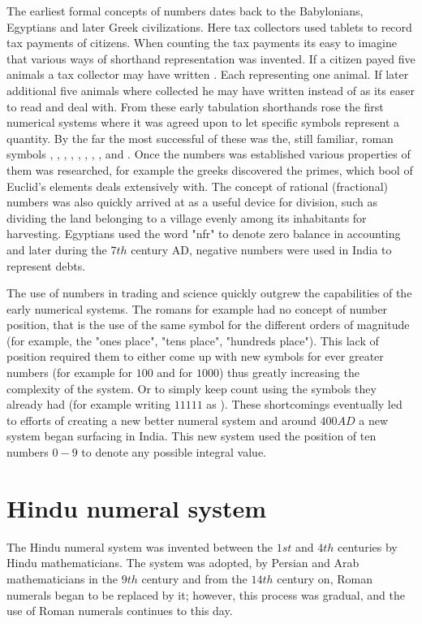 \myindent The earliest formal concepts of numbers dates back to the Babylonians, Egyptians and later Greek civilizations. Here tax collectors used tablets to record tax payments of citizens. When counting the tax payments its easy to imagine that various ways of shorthand representation was invented. If a citizen payed five animals a tax collector may have written . Each  representing one animal. If later additional five animals where collected he may have written  instead of  as its easer to read and deal with. From these early tabulation shorthands rose the first numerical systems where it was agreed upon to let specific symbols represent a quantity. By the far the most successful of these was the, still familiar, roman symbols , , , , , , , ,  and . Once the numbers was established various properties of them was researched, for example the greeks discovered the primes, which bool  of Euclid's elements deals extensively with. The concept of rational (fractional) numbers was also quickly arrived at as a useful device for division, such as dividing the land belonging to a village evenly among its inhabitants for harvesting. Egyptians used the word "nfr" to denote zero balance in accounting and later during the $7th$ century AD, negative numbers were used in India to represent debts.

\myindent The use of numbers in trading and science quickly outgrew the capabilities of the early numerical systems. The romans for example had no concept of number position, that is the use of the same symbol for the different orders of magnitude (for example, the "ones place", "tens place", "hundreds place"). This lack of position required them to either come up with new symbols for ever greater numbers (for example  for $100$ and  for $1000$) thus greatly increasing the complexity of the system. Or to simply keep count using the symbols they already had (for example writing $11111$ as ). These shortcomings eventually led to efforts of creating a new better numeral system and around $400 AD$ a new system began surfacing in India. This new system used the position of ten numbers $0-9$ to denote any possible integral value.

\section{Hindu numeral system}
The Hindu numeral system was invented between the $1st$ and $4th$ centuries by Hindu mathematicians. The system was adopted, by Persian and Arab mathematicians in the $9th$ century and from the $14th$ century on, Roman numerals began to be replaced by it; however, this process was gradual, and the use of Roman numerals continues to this day.

